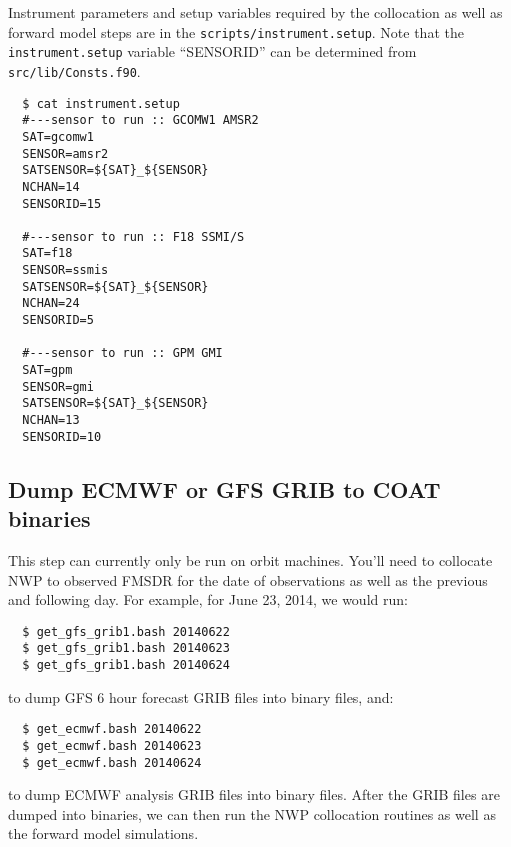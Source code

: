 \documentclass[10pt]{report}
\begin{document}
Instrument parameters and setup variables required by the collocation as well as forward model 
steps are in the {\tt scripts/instrument.setup}.  Note that the {\tt instrument.setup} 
variable ``SENSORID'' can be determined from {\tt src/lib/Consts.f90}.
\begin{verbatim}
  $ cat instrument.setup
  #---sensor to run :: GCOMW1 AMSR2
  SAT=gcomw1
  SENSOR=amsr2
  SATSENSOR=${SAT}_${SENSOR}
  NCHAN=14
  SENSORID=15

  #---sensor to run :: F18 SSMI/S
  SAT=f18
  SENSOR=ssmis
  SATSENSOR=${SAT}_${SENSOR}
  NCHAN=24
  SENSORID=5

  #---sensor to run :: GPM GMI
  SAT=gpm
  SENSOR=gmi
  SATSENSOR=${SAT}_${SENSOR}
  NCHAN=13
  SENSORID=10
\end{verbatim}

\subsection{Dump ECMWF or GFS GRIB to COAT binaries}\label{ssec:GRIBdump}
This step can currently only be run on orbit machines.  You'll need to collocate NWP to 
observed FMSDR for the date of observations as well as the previous and following day.  For example,
for June 23, 2014, we would run:
\begin{verbatim}
  $ get_gfs_grib1.bash 20140622
  $ get_gfs_grib1.bash 20140623
  $ get_gfs_grib1.bash 20140624
\end{verbatim}
to dump GFS 6 hour forecast GRIB files into binary files, and: 
\begin{verbatim}
  $ get_ecmwf.bash 20140622
  $ get_ecmwf.bash 20140623
  $ get_ecmwf.bash 20140624
\end{verbatim}
to dump ECMWF analysis GRIB files into binary files.  After the GRIB files are dumped into binaries, 
we can then run the NWP collocation routines as well as the forward model simulations.
\end{document}
